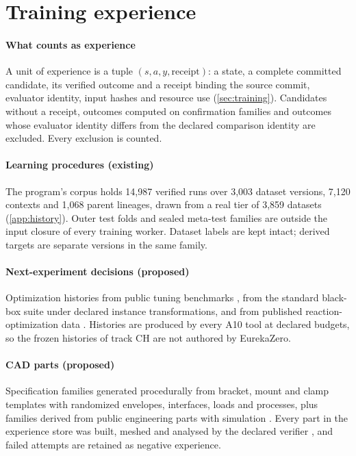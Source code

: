 \section{Training experience}
\label{app:corpus}

\paragraph{What counts as experience} A unit of experience is a tuple
$(s,a,y,\mathrm{receipt})$: a state, a complete committed candidate, its verified outcome and a
receipt binding the source commit, evaluator identity, input hashes and resource use
(\cref{sec:training}). Candidates without a receipt, outcomes computed on confirmation families and
outcomes whose evaluator identity differs from the declared comparison identity are excluded. Every
exclusion is counted.

\paragraph{Learning procedures (existing)} The program's corpus holds 14,987 verified runs over 3,003
dataset versions, 7,120 contexts and 1,068 parent lineages, drawn from a real tier of 3,859 datasets
\est{} (\cref{app:history}). Outer test folds and sealed meta-test families are outside the input
closure of every training worker. Dataset labels are kept intact; derived targets are separate
versions in the same family.

\paragraph{Next-experiment decisions (proposed)} Optimization histories from public tuning
benchmarks \citep{pineda2021hpob}, from the standard black-box suite \citep{hansen2021coco} under
declared instance transformations, and from published reaction-optimization data
\citep{shields2021reaction,ahneman2018cn}. Histories are produced by every A10 tool at declared
budgets, so the frozen histories of track CH are not authored by EurekaZero.

\paragraph{CAD parts (proposed)} Specification families generated procedurally from bracket, mount
and clamp templates with randomized envelopes, interfaces, loads and processes, plus families derived
from public engineering parts with simulation \citep{whalen2021simjeb}. Every part in the experience
store was built, meshed and analysed by the declared verifier \citep{geuzaine2009gmsh}, and failed
attempts are retained as negative experience.

